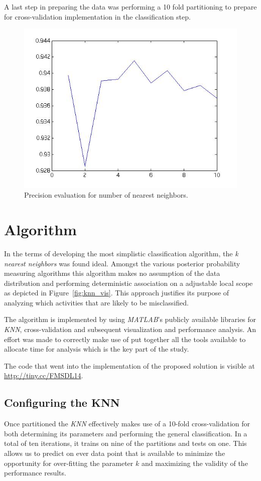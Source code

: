 \documentclass{sig-alternate}
\begin{document}
A last step in preparing the data was performing a 10 fold partitioning to prepare for cross-validation implementation in the classification step.


\begin{figure}[bp]
\begin{center}
\includegraphics[width=0.6\linewidth]{visual_results/evaluate_k_both_perf.jpg}
\end{center}
\caption{Precision evaluation for number of nearest neighbors.}
\label{fig:eval_k_both_perf}
\end{figure}

\section{Algorithm}
In the terms of developing the most simplistic classification algorithm, the \textit{k nearest neighbors} was found ideal. Amongst the various posterior probability measuring algorithms this algorithm makes no assumption of the data distribution and performing deterministic association on a adjustable local scope as depicted in Figure~\ref{fig:knn_vis}. This approach justifies its purpose of analyzing which activities that are likely to be misclassified. 

The algorithm is implemented by using \textit{MATLAB}'s publicly available libraries for \textit{KNN}, cross-validation and subsequent visualization and performance analysis. An effort was made to correctly make use of put together all the tools available to allocate time for analysis which is the key part of the study.

The code that went into the implementation of the proposed solution is visible at \url{http://tiny.cc/FMSDL14}.

\subsection{Configuring the KNN}
Once partitioned the \textit{KNN} effectively makes use of a 10-fold cross-validation for both determining its parameters and performing the general classification. In a total of ten iterations, it trains on nine of the partitions and tests on one. This allows us to predict on ever data point that is available to minimize the opportunity for over-fitting the parameter $k$ and maximizing the validity of the performance results.
\end{document}
